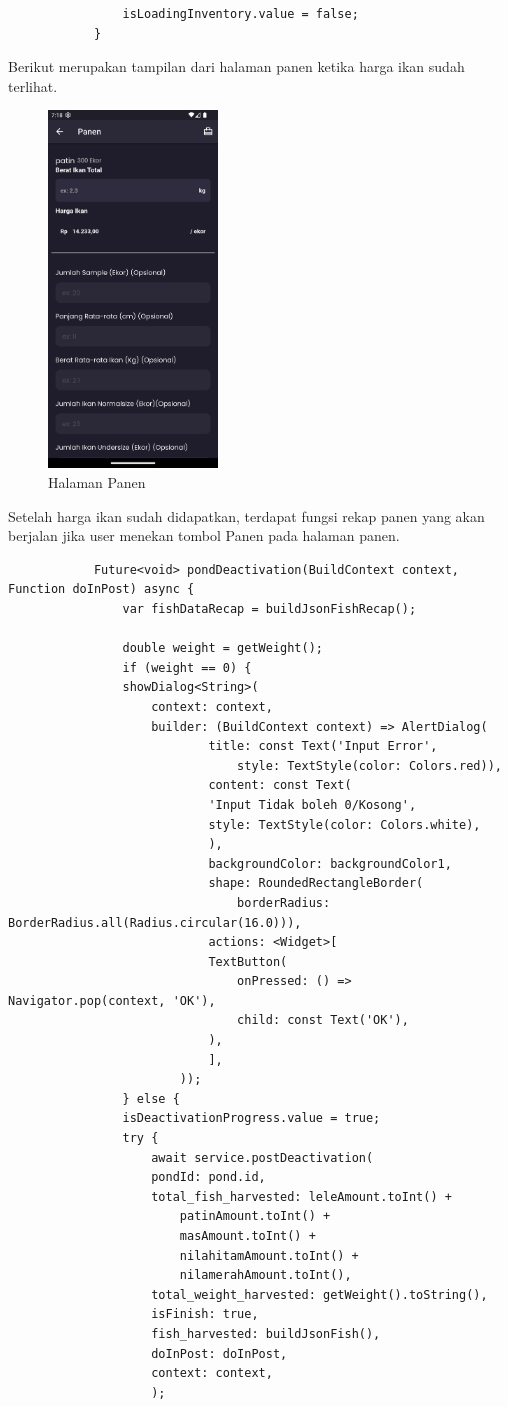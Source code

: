 \begin{spacing}{1.5}
\begin{enumerate}
\begin{lstlisting}
				isLoadingInventory.value = false;
			}
		\end{lstlisting}

		Berikut merupakan tampilan dari halaman panen ketika harga ikan sudah terlihat.

		\begin{figure}[H]
			\centering
			\includegraphics[width=0.4\textwidth]{gambar/sprint5/panen.png}
			\caption{Halaman Panen}
		\end{figure}
		
		Setelah harga ikan sudah didapatkan, terdapat fungsi rekap panen yang akan berjalan jika user menekan tombol Panen pada halaman panen.

		\begin{lstlisting}
			Future<void> pondDeactivation(BuildContext context, Function doInPost) async {
				var fishDataRecap = buildJsonFishRecap();

				double weight = getWeight();
				if (weight == 0) {
				showDialog<String>(
					context: context,
					builder: (BuildContext context) => AlertDialog(
							title: const Text('Input Error',
								style: TextStyle(color: Colors.red)),
							content: const Text(
							'Input Tidak boleh 0/Kosong',
							style: TextStyle(color: Colors.white),
							),
							backgroundColor: backgroundColor1,
							shape: RoundedRectangleBorder(
								borderRadius: BorderRadius.all(Radius.circular(16.0))),
							actions: <Widget>[
							TextButton(
								onPressed: () => Navigator.pop(context, 'OK'),
								child: const Text('OK'),
							),
							],
						));
				} else {
				isDeactivationProgress.value = true;
				try {
					await service.postDeactivation(
					pondId: pond.id,
					total_fish_harvested: leleAmount.toInt() +
						patinAmount.toInt() +
						masAmount.toInt() +
						nilahitamAmount.toInt() +
						nilamerahAmount.toInt(),
					total_weight_harvested: getWeight().toString(),
					isFinish: true,
					fish_harvested: buildJsonFish(),
					doInPost: doInPost,
					context: context,
					);


\end{lstlisting}
\end{enumerate}
\end{spacing}

